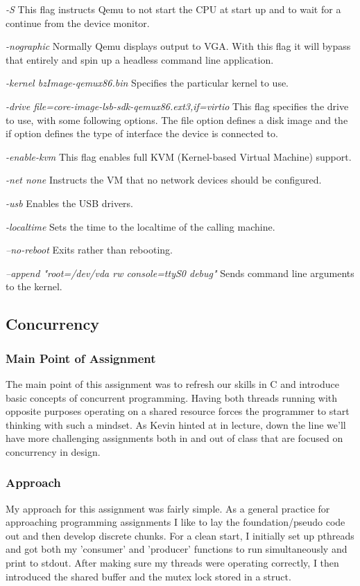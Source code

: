 \documentclass[10pt,draftclsnofoot,onecolumn]{IEEEtran}
\begin{document}
\textit{-S}
This flag instructs Qemu to not start the CPU at start up and to wait for a continue from the device monitor.

\textit{-nographic}
Normally Qemu displays output to VGA.
With this flag it will bypass that entirely and spin up a headless command line application.

\textit{-kernel bzImage-qemux86.bin}
Specifies the particular kernel to use.

\textit{-drive file=core-image-lsb-sdk-qemux86.ext3,if=virtio}
This flag specifies the drive to use, with some following options.
The file option defines a disk image and the if option defines the type of interface the device is connected to.

\textit{-enable-kvm}
This flag enables full KVM (Kernel-based Virtual Machine) support.

\textit{-net none}
Instructs the VM that no network devices should be configured.

\textit{-usb}
Enables the USB drivers.

\textit{-localtime}
Sets the time to the localtime of the calling machine.

\textit{--no-reboot}
Exits rather than rebooting.

\textit{--append "root=/dev/vda rw console=ttyS0 debug"}
Sends command line arguments to the kernel.

\subsection{Concurrency}
\subsubsection{Main Point of Assignment}
The main point of this assignment was to refresh our skills in C and introduce basic concepts of concurrent programming.
Having both threads running with opposite purposes operating on a shared resource forces the programmer to start thinking with such a mindset.
As Kevin hinted at in lecture, down the line we'll have more challenging assignments both in and out of class that are focused on concurrency in design.

\subsubsection{Approach}
My approach for this assignment was fairly simple.
As a general practice for approaching programming assignments I like to lay the foundation/pseudo code out and then develop discrete chunks.
For a clean start, I initially set up pthreads and got both my 'consumer' and 'producer' functions to run simultaneously and print to stdout.
After making sure my threads were operating correctly, I then introduced the shared buffer and the mutex lock stored in a struct.
\end{document}
